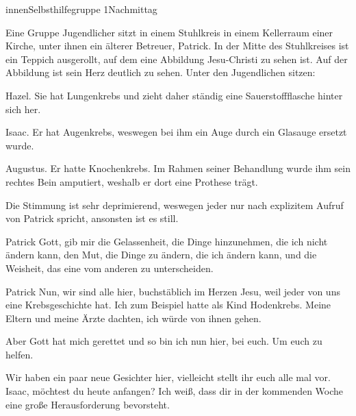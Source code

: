 \documentclass[12pt]{article}
\begin{document}
    \begin{scene}[cut to]{innen}{Selbsthilfegruppe 1}{Nachmittag}
        \begin{scenedescription}
            Eine Gruppe Jugendlicher sitzt in einem Stuhlkreis in einem Kellerraum einer Kirche, unter ihnen ein älterer Betreuer, \gls{Patrick}.
            In der Mitte des Stuhlkreises ist ein Teppich ausgerollt, auf dem eine Abbildung Jesu-Christi zu sehen ist.
            Auf der Abbildung ist sein Herz deutlich zu sehen.
            Unter den Jugendlichen sitzen:

            \gls{Hazel}.
            Sie hat Lungenkrebs und zieht daher ständig eine Sauerstoffflasche hinter sich her.

            \gls{Isaac}.
            Er hat Augenkrebs, weswegen bei ihm ein Auge durch ein Glasauge ersetzt wurde.

            \gls{Augustus}.
            Er hatte Knochenkrebs.
            Im Rahmen seiner Behandlung wurde ihm sein rechtes Bein amputiert, weshalb er dort eine Prothese trägt.

            Die Stimmung ist sehr deprimierend, weswegen jeder nur nach explizitem Aufruf von \gls{Patrick} spricht, ansonsten ist es still.
        \end{scenedescription}


        \begin{dialog}[betend]{Patrick}
            Gott, gib mir die Gelassenheit, die Dinge hinzunehmen, die ich nicht ändern kann, den Mut, die Dinge zu ändern,
            die ich ändern kann, und die Weisheit, das eine vom anderen zu unterscheiden.
        \end{dialog}

        \begin{dialog}[Normal]{Patrick}
            Nun, wir sind alle hier, buchstäblich im Herzen Jesu, weil jeder von uns eine Krebsgeschichte hat.
            Ich zum Beispiel hatte als Kind Hodenkrebs.
            Meine Eltern und meine Ärzte dachten, ich würde von ihnen gehen.

            Aber Gott hat mich gerettet und so bin ich nun hier, bei euch.
            Um euch zu helfen.

            Wir haben ein paar neue Gesichter hier, vielleicht stellt ihr euch alle mal vor.
            Isaac, möchtest du heute anfangen?
            Ich weiß, dass dir in der kommenden Woche eine große Herausforderung bevorsteht.
        \end{dialog}


\end{scene}
\end{document}
